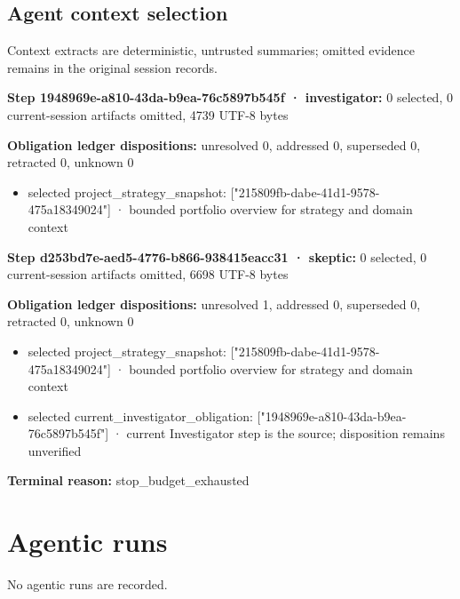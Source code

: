 \documentclass[11pt]{article}
\begin{document}
\subsection{Agent context selection}
Context extracts are deterministic, untrusted summaries; omitted evidence remains in the original session records.\par
\textbf{Step 1948969e-a810-43da-b9ea-76c5897b545f · investigator:} 0 selected, 0 current-session artifacts omitted, 4739 UTF-8 bytes\par
\textbf{Obligation ledger dispositions:} unresolved 0, addressed 0, superseded 0, retracted 0, unknown 0\par
\begin{itemize}
\item selected project\_strategy\_snapshot: ["215809fb-dabe-41d1-9578-475a18349024"] · bounded portfolio overview for strategy and domain context
\end{itemize}
\textbf{Step d253bd7e-aed5-4776-b866-938415eacc31 · skeptic:} 0 selected, 0 current-session artifacts omitted, 6698 UTF-8 bytes\par
\textbf{Obligation ledger dispositions:} unresolved 1, addressed 0, superseded 0, retracted 0, unknown 0\par
\begin{itemize}
\item selected project\_strategy\_snapshot: ["215809fb-dabe-41d1-9578-475a18349024"] · bounded portfolio overview for strategy and domain context
\item selected current\_investigator\_obligation: ["1948969e-a810-43da-b9ea-76c5897b545f"] · current Investigator step is the source; disposition remains unverified
\end{itemize}
\textbf{Terminal reason:} stop\_budget\_exhausted\par
\section{Agentic runs}
No agentic runs are recorded.\par
\end{document}
